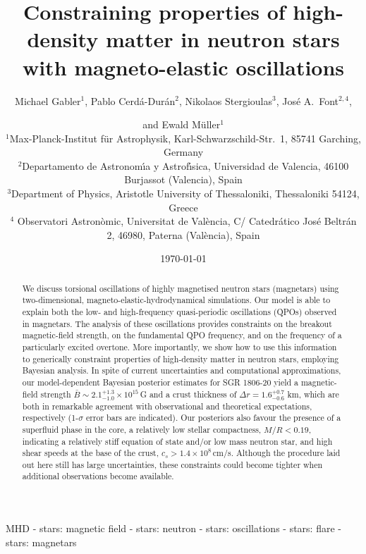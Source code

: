 \documentclass[useAMS,usenatbib]{mnras}
\begin{document}
%
\title{Constraining properties of high-density matter in neutron stars with magneto-elastic oscillations}
%
\author[Michael Gabler, Pablo Cerd\'a-Dur\'an, Nikolaos Stergioulas, Jos\'e A.~Font and Ewald M\"uller]
{Michael Gabler$^{1}$, %
Pablo Cerd\'a-Dur\'an$^2$, %
Nikolaos Stergioulas$^3$, %
Jos\'e A.~Font$^{2,4}$, %
\and and 
Ewald M\"uller$^1$ %
\\
  $^1$Max-Planck-Institut f\"ur Astrophysik,
  Karl-Schwarzschild-Str.~1, 85741 Garching, Germany \\
  $^2$Departamento de Astronom\'{\i}a y Astrof\'{\i}sica,
  Universidad de Valencia, 46100 Burjassot (Valencia), Spain\\
  $^3$Department of Physics, Aristotle University of Thessaloniki,
  Thessaloniki 54124, Greece \\
  $^4$ Observatori Astron\`omic, Universitat de Val\`encia, C/ Catedr\'atico 
  Jos\'e Beltr\'an 2, 46980, Paterna (Val\`encia), Spain \\
  }
%
\date{\today}
%
\maketitle
%
%
\begin{abstract}
We discuss torsional oscillations of highly magnetised neutron stars (magnetars) 
using two-dimensional, magneto-elastic-hydrodynamical simulations. Our model is 
able to explain both the low- and high-frequency quasi-periodic oscillations 
(QPOs) observed in magnetars. The analysis of these oscillations provides 
constraints on the breakout magnetic-field strength, on the fundamental QPO 
frequency, and on the frequency of a particularly excited overtone. More 
importantly, we show how to use this information to generically constraint  
properties of high-density matter in neutron stars, employing Bayesian analysis.
In spite of current uncertainties and computational 
approximations, our model-dependent Bayesian posterior estimates for SGR 
1806-20 yield a magnetic-field strength $\bar B\sim 
2.1^{+1.3}_{-1.0}\times10^{15}\,$G and a crust thickness of $\Delta r = 
1.6^{+0.7}_{-0.6}$ km,
which are both in remarkable agreement with 
observational and theoretical expectations, respectively (1-$\sigma$ 
error bars are indicated). Our posteriors also favour the presence of a 
superfluid phase in the core, a relatively low stellar compactness, 
$M/R<0.19$, indicating a relatively stiff equation of state and/or low 
mass neutron star, and high shear speeds at the base of the crust, 
$c_s>1.4\times10^8\,$cm/s. Although the procedure laid out here still 
has large uncertainties, these constraints could become tighter when additional 
observations become available.
\end{abstract}
%
%
\begin{keywords}
MHD - stars: magnetic field - stars: neutron - stars: oscillations  -
stars: flare - stars: magnetars
\end{keywords}
%
\end{document}
